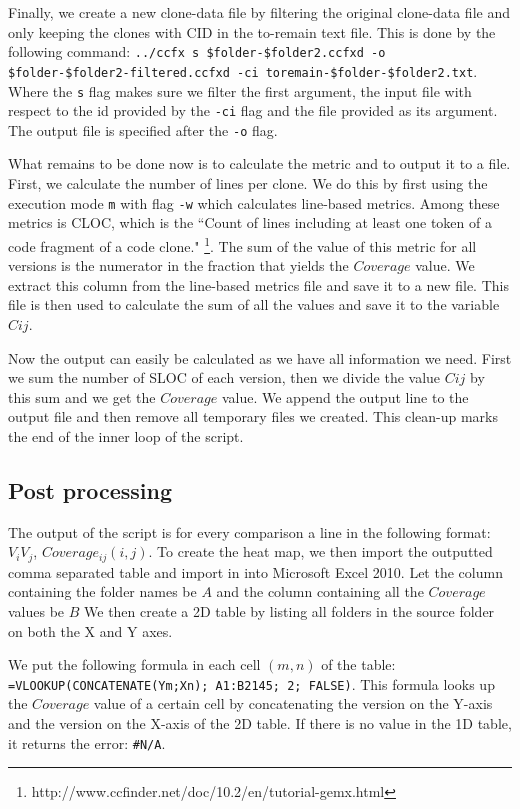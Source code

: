 \documentclass[a4paper,twoside, twocolumn, 11pt]{article}
\numberwithin{equation}{section}
\begin{document}
Finally, we create a new clone-data file by filtering the original clone-data file and only keeping the clones with CID in the to-remain text file.
This is done by the following command: \texttt{../ccfx s \$folder-\$folder2.ccfxd -o \$folder-\$folder2-filtered.ccfxd -ci toremain-\$folder-\$folder2.txt}.
Where the \texttt{s} flag makes sure we filter the first argument, the input file with respect to the id provided by the \texttt{-ci} flag and the file provided as its argument.
The output file is specified after the \texttt{-o} flag.

What remains to be done now is to calculate the metric and to output it to a file.
First, we calculate the number of lines per clone.
We do this by first using the execution mode \texttt{m} with flag \texttt{-w} which calculates line-based metrics.
Among these metrics is CLOC, which is the ``Count of lines including at least one token of a code fragment of a code clone." \footnote{http://www.ccfinder.net/doc/10.2/en/tutorial-gemx.html}.
The sum of the value of this metric for all versions is the numerator in the fraction that yields the $Coverage$ value.
We extract this column from the line-based metrics file and save it to a new file.
This file is then used to calculate the sum of all the values and save it to the variable $Cij$.

Now the output can easily be calculated as we have all information we need. 
First we sum the number of SLOC of each version, then we divide the value $Cij$ by this sum and we get the $Coverage$ value.
We append the output line to the output file and then remove all temporary files we created.
This clean-up marks the end of the inner loop of the script.

\subsection{Post processing}
The output of the script is for every comparison a line in the following format: $V_iV_j$, $Coverage_{ij}(i,j)$.
To create the heat map, we then import the outputted comma separated table and import in into Microsoft Excel 2010.
Let the column containing the folder names be $A$ and the column containing all the $Coverage$ values be $B$
We then create a 2D table by listing all folders in the source folder on both the X and Y axes.

We put the following formula in each cell $(m,n)$ of the table: 
\texttt{=VLOOKUP(CONCATENATE(Ym;Xn); A1:B2145; 2; FALSE)}.
This formula looks up the $Coverage$ value of a certain cell by concatenating the version on the Y-axis and the version on the X-axis of the 2D table.
If there is no value in the 1D table, it returns the error: \texttt{\#N/A}.
\end{document}
